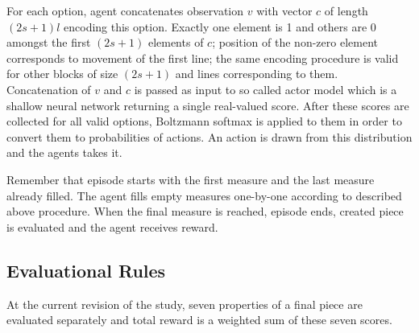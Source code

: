 \documentclass{article}
\begin{document}
For each option, agent concatenates observation $v$ with vector $c$ of length $(2s + 1)l$ encoding this option. Exactly one element is 1 and others are 0 amongst the first $(2s + 1)$ elements of $c$; position of the non-zero element corresponds to movement of the first line; the same encoding procedure is valid for other blocks of size $(2s + 1)$ and lines corresponding to them. Concatenation of $v$ and $c$ is passed as input to so called actor model which is a shallow neural network returning a single real-valued score. After these scores are collected for all valid options, Boltzmann softmax is applied to them in order to convert them to probabilities of actions. An action is drawn from this distribution and the agents takes it.

Remember that episode starts with the first measure and the last measure already filled. The agent fills empty measures one-by-one according to described above procedure. When the final measure is reached, episode ends, created piece is evaluated and the agent receives reward.

\subsection{Evaluational Rules}
\label{subsec:setup}

At the current revision of the study, seven properties of a final piece are evaluated separately and total reward is a weighted sum of these seven scores.
\end{document}
